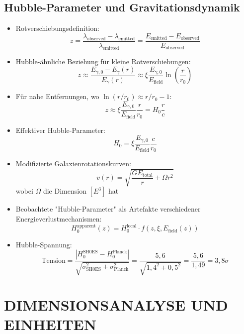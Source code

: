 \documentclass[12pt,a4paper]{article}
\begin{document}
	\subsection{Hubble-Parameter und Gravitationsdynamik}
	\begin{itemize}
		\item Rotverschiebungsdefinition:
		$$z = \frac{\lambda_{\text{observed}} - \lambda_{\text{emitted}}}{\lambda_{\text{emitted}}} = \frac{E_{\text{emitted}} - E_{\text{observed}}}{E_{\text{observed}}}$$
		
		\item Hubble-\"{a}hnliche Beziehung f\"{u}r kleine Rotverschiebungen:
		$$z \approx \frac{E_{\gamma,0} - E_\gamma(r)}{E_\gamma(r)} \approx \xi \frac{E_{\gamma,0}}{E_{\text{field}}} \ln\left(\frac{r}{r_0}\right)$$
		
		\item F\"{u}r nahe Entfernungen, wo $\ln(r/r_0) \approx r/r_0 - 1$:
		$$z \approx \xi \frac{E_{\gamma,0}}{E_{\text{field}}} \frac{r}{r_0} = H_0 \frac{r}{c}$$
		
		\item Effektiver Hubble-Parameter:
		$$H_0 = \xi \frac{E_{\gamma,0}}{E_{\text{field}}} \frac{c}{r_0}$$
		
		\item Modifizierte Galaxienrotationskurven:
		$$v(r) = \sqrt{\frac{GE_{\text{total}}}{r} + \Omega r^2}$$
		wobei $\Omega$ die Dimension $[E^3]$ hat
		
		\item Beobachtete "Hubble-Parameter" als Artefakte verschiedener Energieverlustmechanismen:
		$$H_0^{\text{apparent}}(z) = H_0^{\text{local}} \cdot f(z, \xi, E_{\text{field}}(z))$$
		
		\item Hubble-Spannung:
		$$\text{Tension} = \frac{|H_0^{\text{SH0ES}} - H_0^{\text{Planck}}|}{\sqrt{\sigma_{\text{SH0ES}}^2 + \sigma_{\text{Planck}}^2}} = \frac{5,6}{\sqrt{1,4^2 + 0,5^2}} = \frac{5,6}{1,49} = 3,8\sigma$$
	\end{itemize}
	
	\section{DIMENSIONSANALYSE UND EINHEITEN}
	
\end{document}
